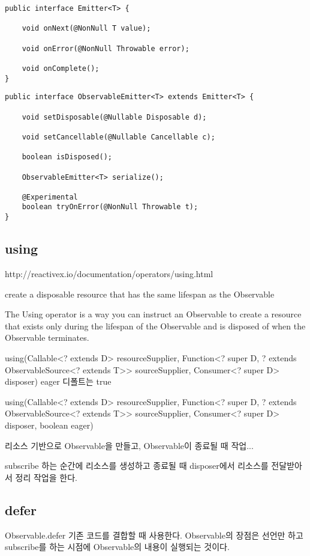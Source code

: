 \documentclass{book}
\begin{document}
\begin{verbatim}
public interface Emitter<T> {

    void onNext(@NonNull T value);

    void onError(@NonNull Throwable error);

    void onComplete();
}
\end{verbatim}

\begin{verbatim}
public interface ObservableEmitter<T> extends Emitter<T> {

    void setDisposable(@Nullable Disposable d);

    void setCancellable(@Nullable Cancellable c);

    boolean isDisposed();

    ObservableEmitter<T> serialize();

    @Experimental
    boolean tryOnError(@NonNull Throwable t);
}
\end{verbatim}

\subsection{using}
http://reactivex.io/documentation/operators/using.html

create a disposable resource that has the same lifespan as the Observable

The Using operator is a way you can instruct an Observable to create a resource that exists only during the lifespan of the Observable and is disposed of when the Observable terminates.

using(Callable<? extends D> resourceSupplier, Function<? super D, ? extends ObservableSource<? extends T>> sourceSupplier, Consumer<? super D> disposer)
eager 디폴트는 true

using(Callable<? extends D> resourceSupplier, Function<? super D, ? extends ObservableSource<? extends T>> sourceSupplier, Consumer<? super D> disposer, boolean eager)

리소스 기반으로 Observable을 만들고, Observable이 종료될 때 작업...

subscribe 하는 순간에 리소스를 생성하고 종료될 때 disposer에서 리소스를 전달받아서 정리 작업을 한다.




\subsection{defer}
Observable.defer
기존 코드를 결합할 때 사용한다.
Observable의 장점은 선언만 하고 subscribe를 하는 시점에 Observable의 내용이 실행되는 것이다.
\end{document}
